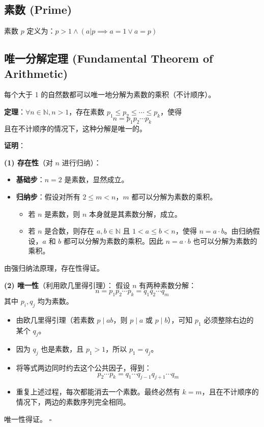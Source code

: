 \documentclass[12pt, a4paper]{article}
\begin{document}
\subsection*{素数 (Prime)}
素数 \(p\) 定义为：\(p > 1 \land (a|p \implies a=1 \lor a=p)\)

\subsection*{唯一分解定理 (Fundamental Theorem of Arithmetic)}
每个大于 1 的自然数都可以唯一地分解为素数的乘积（不计顺序）。

\begin{mdframed}
\textbf{定理}：\(\forall n \in \mathbb{N}, n > 1\)，存在素数 \(p_1 \leq p_2 \leq \cdots \leq p_k\)，使得
\[
n = p_1 p_2 \cdots p_k
\]
且在不计顺序的情况下，这种分解是唯一的。

\textbf{证明}：

\textbf{(1) 存在性}（对 \(n\) 进行归纳）：
\begin{itemize}
    \item \textbf{基础步}：\(n=2\) 是素数，显然成立。
    \item \textbf{归纳步}：假设对所有 \(2 \leq m < n\)，\(m\) 都可以分解为素数的乘积。
    \begin{itemize}
        \item 若 \(n\) 是素数，则 \(n\) 本身就是其素数分解，成立。
        \item 若 \(n\) 是合数，则存在 \(a, b \in \mathbb{N}\) 且 \(1 < a \leq b < n\)，使得 \(n = a \cdot b\)。由归纳假设，\(a\) 和 \(b\) 都可以分解为素数的乘积。因此 \(n = a \cdot b\) 也可以分解为素数的乘积。
    \end{itemize}
\end{itemize}
由强归纳法原理，存在性得证。

\textbf{(2) 唯一性}（利用欧几里得引理）：
假设 \(n\) 有两种素数分解：
\[
n = p_1 p_2 \cdots p_k = q_1 q_2 \cdots q_m
\]
其中 \(p_i, q_j\) 均为素数。
\begin{itemize}
    \item 由欧几里得引理（若素数 \(p \mid ab\)，则 \(p \mid a\) 或 \(p \mid b\)），可知 \(p_1\) 必须整除右边的某个 \(q_j\)。
    \item 因为 \(q_j\) 也是素数，且 \(p_1 > 1\)，所以 \(p_1 = q_j\)。
    \item 将等式两边同时约去这个公共因子，得到：
    \[
    p_2 \cdots p_k = q_1 \cdots q_{j-1} q_{j+1} \cdots q_m
    \]
    \item 重复上述过程，每次都能消去一个素数。最终必然有 \(k = m\)，且在不计顺序的情况下，两边的素数序列完全相同。
\end{itemize}
唯一性得证。 \hfill \(\square\)
\end{mdframed}
\end{document}
